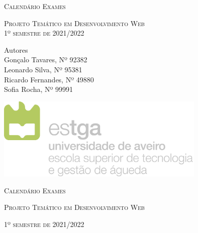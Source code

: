 \documentclass[11pt, twoside]{report}
\begin{document}
	
\onehalfspacing %

	
	
	
	\begin{titlepage}
		\centering
		\scshape\Huge Calendário Exames\par
		\vspace{0.9cm}
		
		\scshape\large Projeto Temático em Desenvolvimento Web \\
		\vspace{0.3cm}
		\scshape\large 1º semestre de 2021/2022\par
		\vspace{0.4cm}
		\centering
		
		\vspace{1cm}
		
		\large
		Autores\\
		Gonçalo Tavares, Nº 92382  \\
		Leonardo Silva, Nº 95381 \\
		Ricardo Fernandes, Nº 49880 \\
		Sofia Rocha, Nº 99991 \\
		
		\vspace{1cm}
		
		\centering
		\includegraphics[width=10cm]{image/AssB_vertical_cor.png}
		
		\newpage
		\thispagestyle{plain}%
		\thispagestyle{empty}%
		\centering
		\scshape\Huge Calendário Exames \par
		\vspace{1cm}
		
		\scshape\large Projeto Temático em Desenvolvimento Web\par
		\vspace{1cm}
		\scshape\large 1º semestre de 2021/2022\par
		\vspace{4cm}
		

\end{titlepage}
\end{document}
